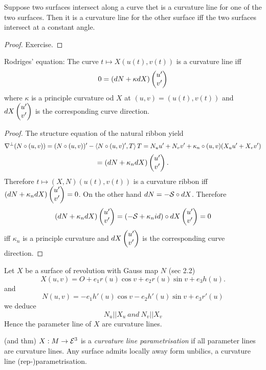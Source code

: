 \begin{theorem}
	Suppose two surfaces intersect along a curve thet is a curvature line for one of the two surfaces. Then it is a curvature line for the other surface iff the two surfaces intersect at a constant angle.
\end{theorem}

\begin{proof}
	Exercise.
\end{proof}

\begin{definition}
	Rodriges' equation: The curve $t \mapsto X(u(t),v(t))$ is a curvature line iff 
		\[ 0 = (dN + \kappa  dX) \begin{pmatrix} u'\\v' \end{pmatrix} \]
	where $\kappa$ is a principle curvature od $X$ at $(u,v)= (u(t),v(t))$ and $dX \begin{pmatrix} u'\\v' \end{pmatrix}$ is the corresponding curve direction.
\end{definition}

\begin{proof}
	The structure equation of the natural ribbon yield
		\[ \nabla^\perp (N \circ (u,v)) = (N \circ (u,v))' - \left \langle N \circ (u,v)',T \right\rangle T
			= N_uu' + N_vv'+ \kappa_n\circ (u,v)(X_uu' + X_vv') \]
		\[ = (dN + \kappa_n dX)\begin{pmatrix} u'\\v' \end{pmatrix}. \]
	Therefore $t \mapsto (X,N)(u(t),v(t))$ is a curvature ribbon iff $(dN + \kappa_n dX) \begin{pmatrix} u'\\v' \end{pmatrix}=0$.
	On the other hand $dN = -\mathcal S \circ dX$. Therefore
		\[ (dN + \kappa_n dX)\begin{pmatrix} u'\\v' \end{pmatrix} = (-\mathcal S + \kappa_n id ) \circ dX \begin{pmatrix} u'\\v' \end{pmatrix} =0 \]
	iff $\kappa_n$ is a principle curvature and $dX \begin{pmatrix} u'\\v' \end{pmatrix}$ is the corresponding curve direction. 
\end{proof}

\begin{example}
	Let $X$ be a surface of revolution with Gauss map $N$ (sec 2.2)
		\[ X(u,v)= O + e_1 r(u) \cos v + e_2 r(u) \sin v + e_3 h(u). \]
	and 
		\[ N(u,v) = -e_1 h'(u) \cos v - e_2 h'(u) \sin v + e_3 r'(u) \]
	we deduce
		\[ N_u || X_u \ and \ N_v || X_v \]
	Hence the parameter line of $X$ are curvature lines.
\end{example}

\begin{definition} (and thm)
	$X: M \to \mathcal E^3$ is a \emph{curvature line parametrisation} if all parameter lines are curvature lines. Any surface admits locally away form unbilics, a curvature line (rep-)parametrisation.
\end{definition}

